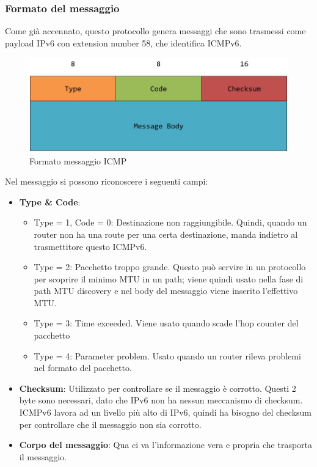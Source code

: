 \documentclass{article}
\begin{document}
\subsubsection{Formato del messaggio}
Come già accennato, questo protocollo genera messaggi che sono trasmessi come payload IPv6 con extension number 58, che identifica ICMPv6.
\begin{figure}[H]
\centering
\includegraphics[scale=0.4]{figures/icmp_format.jpg}
\caption{Formato messaggio ICMP}
\end{figure}
Nel messaggio si possono riconoscere i seguenti campi:
\begin{itemize}
    \item \textbf{Type \& Code}:
        \begin{itemize}
            \item Type = 1, Code = 0: Destinazione non raggiungibile. Quindi, quando un router non ha una route per una certa destinazione, manda indietro al trasmettitore questo ICMPv6.
            \item Type = 2: Pacchetto troppo grande. Questo può servire in un protocollo per scoprire il minimo MTU in un path; viene quindi usato nella fase di path MTU discovery e nel body del messaggio viene inserito l'effettivo MTU.
            \item Type = 3: Time exceeded. Viene usato quando scade l'hop counter del pacchetto
            \item Type = 4: Parameter problem. Usato quando un router rileva problemi nel formato del pacchetto.
        \end{itemize}{}
    \item \textbf{Checksum}: Utilizzato per controllare se il messaggio è corrotto. Questi 2 byte sono necessari, dato che IPv6 non ha nessun meccanismo di checksum. ICMPv6 lavora ad un livello più alto di IPv6, quindi ha bisogno del checksum per controllare che il messaggio non sia corrotto.
    \item \textbf{Corpo del messaggio}: Qua ci va l'informazione vera e propria che trasporta il messaggio. 
\end{itemize}
\end{document}
